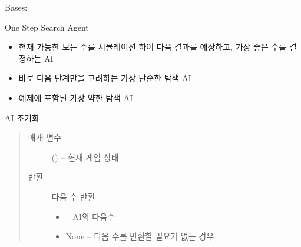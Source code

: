 \documentclass[letterpaper,10pt,english]{sphinxmanual}
\begin{document}
\begin{fulllineitems}
\label{\detokenize{agents.search:agents.search.one_step_search_agent.OneStepSearchAgent}}
Bases: {\hyperref[\detokenize{agents:agents.BaseAgent}]{}}

One Step Search Agent
\begin{itemize}
\item {} 
현재 가능한 모든 수를 시뮬레이션 하여 다음 결과를 예상하고, 가장 좋은 수를 결정하는 AI

\item {} 
바로 다음 단계만을 고려하는 가장 단순한 탐색 AI

\item {} 
예제에 포함된 가장 약한 탐색 AI

\end{itemize}

\begin{fulllineitems}
\label{\detokenize{agents.search:agents.search.one_step_search_agent.OneStepSearchAgent.act}}
AI 초기화
\begin{quote}\begin{description}
\item[{매개 변수}] \leavevmode
{} ({\hyperref[\detokenize{scripts:scripts.run_game.State}]{}}) -- 현재 게임 상태

\item[{반환}] \leavevmode

다음 수 반환
\begin{itemize}
\item {} 
 -- AI의 다음수

\item {} 
None -- 다음 수를 반환할 필요가 없는 경우

\end{itemize}


\end{description}\end{quote}


\end{fulllineitems}
\end{fulllineitems}
\end{document}
